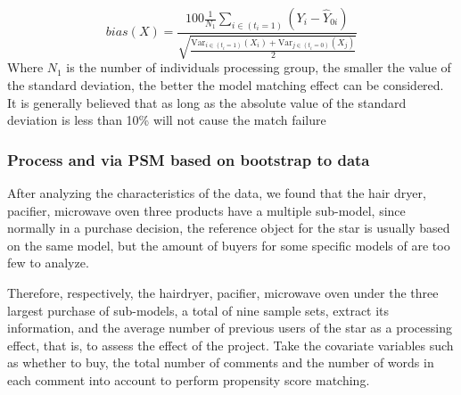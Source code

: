 \documentclass{mcmthesis}
\begin{document}
\begin{itemize}
\begin{equation}
\end{equation}
\begin{equation}
bias\left( X \right) =\frac{100\frac{1}{N_1}\sum_{i\in \left( t_i=1 \right)}{\left( Y_i-\hat{Y}_{0i} \right)}}{\sqrt{\frac{\text{Var}_{i\in \left( t_i=1 \right)}\left( X_i \right) +\text{Var}_{j\in \left( t_i=0 \right)}\left( X_j \right)}{2}}} 
\end{equation}
Where $N_1$ is the number of individuals processing group, the smaller the value of the standard deviation, the better the model matching effect can be considered. It is generally believed that as long as the absolute value of the standard deviation is less than 10\% will not cause the match failure
\end{itemize}

\subsubsection{Process and via PSM based on bootstrap to data}
After analyzing the characteristics of the data, we found that the hair dryer, pacifier, microwave oven three products have a multiple sub-model, since normally in a purchase decision, the reference object for the star is usually based on the same model, but the amount of buyers for some specific models of are too few to analyze. 

Therefore, respectively, the hairdryer, pacifier, microwave oven under the three largest purchase of sub-models, a total of nine sample sets, extract its information, and the average number of previous users of the star as a processing effect, that is, to assess the effect of the project. Take the covariate variables such as whether to buy, the total number of comments and the number of words in each comment into account to perform propensity score matching.




\end{document}
